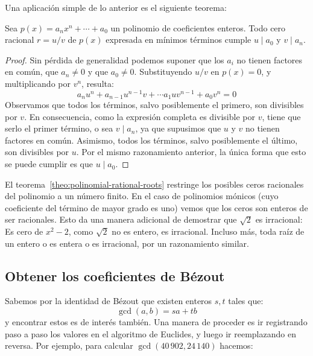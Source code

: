   Una aplicación simple de lo anterior es el siguiente teorema:
  \begin{theorem}
    \label{theo:polinomial-rational-roots}
    Sea \(p(x) = a_n x^n + \dotsb + a_0\)
    un polinomio de coeficientes enteros.
    Todo cero racional \(r = u / v\) de \(p(x)\)
    expresada en mínimos términos cumple
    \(u \mid a_0\) y \(v \mid a_n\).
  \end{theorem}
  \begin{proof}
    Sin pérdida de generalidad
    podemos suponer que los \(a_i\) no tienen factores en común,
    que \(a_n \ne 0\) y que \(a_0 \ne 0\).
    Substituyendo \(u / v\) en \(p(x) = 0\),
    y multiplicando por \(v^n\),
    resulta:
    \begin{equation*}
      a_n u^n + a_{n - 1} u^{n - 1} v + \dotsb a_1 u v^{n - 1} + a_0 v^n
	= 0
    \end{equation*}
    Observamos que todos los términos,
    salvo posiblemente el primero,
    son divisibles por \(v\).
    En consecuencia,
    como la expresión completa es divisible por \(v\),
    tiene que serlo el primer término,
    o sea \(v \mid a_n\),
    ya que supusimos que \(u\) y \(v\) no tienen factores en común.
    Asimismo,
    todos los términos,
    salvo posiblemente el último,
    son divisibles por \(u\).
    Por el mismo razonamiento anterior,
    la única forma que esto se puede cumplir es que
    \(u \mid a_0\).
  \end{proof}
  El teorema~\ref{theo:polinomial-rational-roots}
  restringe los posibles ceros racionales del polinomio a un número finito.
  En el caso de polinomios mónicos
  (cuyo coeficiente del término de mayor grado es uno)
  vemos que los ceros son enteros
  de ser racionales.
  Esto da una manera adicional de demostrar que \(\sqrt{2}\) es irracional:%
  Es cero de \(x^2 - 2\),
  como \(\sqrt{2}\) no es entero,
  es irracional.
  Incluso más,
  toda raíz de un entero o es entera o es irracional,%
  por un razonamiento similar.

\subsection{Obtener los coeficientes de Bézout}
\label{sec:coeficientes-Bezout}

  Sabemos por la identidad de Bézout que existen enteros \(s, t\)
  tales que:%
  \begin{equation*}
    \gcd(a, b) = s a + t b
  \end{equation*}
  y encontrar estos es de interés también.
  Una manera de proceder es ir registrando paso a paso los valores
  en el algoritmo de Euclides,%
  y luego ir reemplazando en reversa.
  Por ejemplo,
  para calcular \(\gcd(40\,902, 24\,140)\) hacemos:

